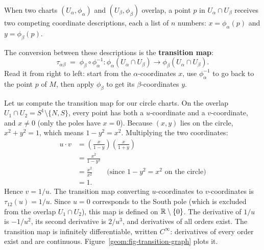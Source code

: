 When two charts $(U_\alpha, \phi_\alpha)$ and $(U_\beta, \phi_\beta)$ overlap, a point $p$ in $U_\alpha \cap U_\beta$ receives two competing coordinate descriptions, each a list of $n$ numbers: $x = \phi_\alpha(p)$ and $y = \phi_\beta(p)$.

The conversion between these descriptions is the \textbf{transition map}:
\[
\tau_{\alpha \beta} \;=\; \phi_\beta \circ \phi_\alpha^{-1} \colon \phi_\alpha(U_\alpha \cap U_\beta) \longrightarrow \phi_\beta(U_\alpha \cap U_\beta).
\]
Read it from right to left: start from the $\alpha$-coordinates $x$, use $\phi_\alpha^{-1}$ to go back to the point $p$ of $M$, then apply $\phi_\beta$ to get its $\beta$-coordinates $y$.

Let us compute the transition map for our circle charts. On the overlap $U_1 \cap U_2 = S^1 \setminus \{N, S\}$, every point has both a $u$-coordinate and a $v$-coordinate, and $x \neq 0$ (only the poles have $x = 0$). Because $(x, y)$ lies on the circle, $x^2 + y^2 = 1$, which means $1 - y^2 = x^2$. Multiplying the two coordinates:
\begin{align*}
u \cdot v &= \left(\frac{x}{1-y}\right) \left(\frac{x}{1+y}\right) \\
&= \frac{x^2}{1-y^2} \\
&= \frac{x^2}{x^2} \qquad \text{(since $1 - y^2 = x^2$ on the circle)} \\
&= 1.
\end{align*}
Hence $v = 1/u$.
The transition map converting $u$-coordinates to $v$-coordinates is $\tau_{12}(u) = 1/u$. Since $u = 0$ corresponds to the South pole (which is excluded from the overlap $U_1 \cap U_2$), this map is defined on $\mathbb{R} \setminus \{0\}$. The derivative of $1/u$ is $-1/u^2$, its second derivative is $2/u^3$, and derivatives of all orders exist. The transition map is infinitely differentiable, written $C^\infty$: derivatives of every order exist and are continuous. Figure~\ref{geom:fig-transition-graph} plots it.

